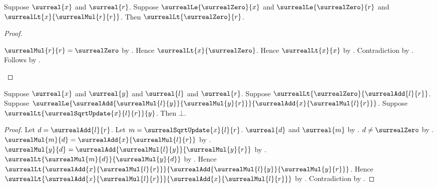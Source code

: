 \begin{lemma}\label{surreal_sqrt_upper_bound_positive}
    Suppose $\surreal{x}$ and $\surreal{r}$.
    Suppose $\surrealLe{\surrealZero}{x}$ and
        $\surrealLe{\surrealZero}{r}$ and
        $\surrealLt{x}{\surrealMul{r}{r}}$.
    Then $\surrealLt{\surrealZero}{r}$.
\end{lemma}
\begin{proof}
    \begin{byCase}
            $\surrealMul{r}{r}=\surrealZero$
                by .
            Hence $\surrealLt{x}{\surrealZero}$.
            Hence $\surrealLt{x}{x}$
                by .
            Contradiction by .
            Follows by .
    \end{byCase}
\end{proof}

\begin{lemma}\label{surreal_sqrt_mixed_update_contradiction}
    Suppose $\surreal{x}$ and $\surreal{y}$ and
        $\surreal{l}$ and $\surreal{r}$.
    Suppose $\surrealLt{\surrealZero}{\surrealAdd{l}{r}}$.
    Suppose
        $\surrealLe{
            \surrealAdd{\surrealMul{l}{y}}{\surrealMul{y}{r}}}{
            \surrealAdd{x}{\surrealMul{l}{r}}}$.
    Suppose $\surrealLt{\surrealSqrtUpdate{x}{l}{r}}{y}$.
    Then $\bot$.
\end{lemma}
\begin{proof}
    Let $d=\surrealAdd{l}{r}$.
    Let $m=\surrealSqrtUpdate{x}{l}{r}$.
    $\surreal{d}$ and $\surreal{m}$
        by
        .
    $d\neq\surrealZero$
        by .
    $\surrealMul{m}{d}=\surrealAdd{x}{\surrealMul{l}{r}}$
        by
        .
    $\surrealMul{y}{d}
        =\surrealAdd{\surrealMul{l}{y}}{\surrealMul{y}{r}}$
        by
        .
    $\surrealLt{\surrealMul{m}{d}}{\surrealMul{y}{d}}$
        by .
    Hence $\surrealLt{
        \surrealAdd{x}{\surrealMul{l}{r}}}{
        \surrealAdd{\surrealMul{l}{y}}{\surrealMul{y}{r}}}$.
    Hence $\surrealLt{
        \surrealAdd{x}{\surrealMul{l}{r}}}{
        \surrealAdd{x}{\surrealMul{l}{r}}}$
        by
        .
    Contradiction by
        .
\end{proof}

